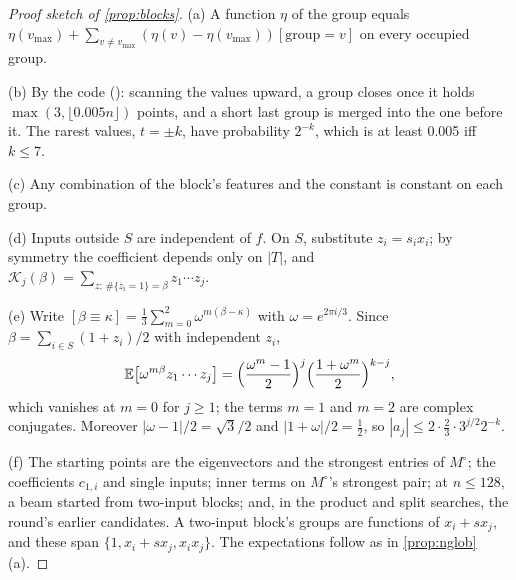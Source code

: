 \begin{proof}[Proof sketch of \cref{prop:blocks}]
(a) A function $\eta$ of the group equals $\eta(v_{\max})+\sum_{v\ne v_{\max}}(\eta(v)-\eta(v_{\max}))[\text{group}=v]$ on every occupied group.

(b) By the code (): scanning the values upward, a group closes once it holds $\max(3,\lfloor0.005n\rfloor)$ points, and a short last group is merged into the one before it. The rarest values, $t=\pm k$, have probability $2^{-k}$, which is at least 0.005 iff $k\le7$.

(c) Any combination of the block's features and the constant is constant on each group.

(d) Inputs outside $S$ are independent of $f$. On $S$, substitute $z_i=s_ix_i$; by symmetry the coefficient depends only on $|T|$, and $\mathcal K_j(\beta)=\sum_{z:\,\#\{z_i=1\}=\beta}z_1\cdots z_j$.

(e) Write $[\beta\equiv\kappa]=\frac13\sum_{m=0}^2\omega^{m(\beta-\kappa)}$ with $\omega=e^{2\pi i/3}$. Since $\beta=\sum_{i\in S}(1+z_i)/2$ with independent $z_i$,
\[
\mathbb{E}\bigl[\omega^{m\beta}z_1\cdots z_j\bigr]=\Bigl(\frac{\omega^m-1}2\Bigr)^j\Bigl(\frac{1+\omega^m}2\Bigr)^{k-j},
\]
which vanishes at $m=0$ for $j\ge1$; the terms $m=1$ and $m=2$ are complex conjugates. Moreover $|\omega-1|/2=\sqrt3/2$ and $|1+\omega|/2=\frac12$, so $|a_j|\le2\cdot\frac23\cdot3^{j/2}2^{-k}$.

(f) The starting points are the eigenvectors and the strongest entries of $M^\circ$; the coefficients $c_{1,i}$ and single inputs; inner terms on $M^\circ$'s strongest pair; at $n\le128$, a beam started from two-input blocks; and, in the product and split searches, the round's earlier candidates. A two-input block's groups are functions of $x_i+sx_j$, and these span $\{1,x_i+sx_j,x_ix_j\}$. The expectations follow as in \cref{prop:nglob}(a).
\end{proof}

